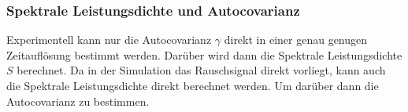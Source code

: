 \documentclass[main.tex]{subfiles}
\begin{document}
\subsubsection{Spektrale Leistungsdichte und Autocovarianz}

Experimentell kann nur die Autocovarianz \(\gamma\) direkt in einer genau genugen Zeitauflösung bestimmt werden. Darüber wird dann die Spektrale Leistungsdichte \(S\) berechnet.
Da in der Simulation das Rauschsignal direkt vorliegt, kann auch die Spektrale Leistungsdichte direkt berechnet werden. Um darüber dann die Autocovarianz zu bestimmen.

\end{document}
